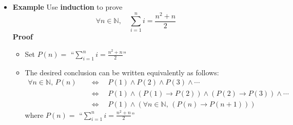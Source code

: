 \documentclass[11pt,twoside]{report}
\begin{document}
\begin{itemize}
\begin{itemize}
\item WLOG assume $p,q$ are coprime (no common divisors)
\begin{align*}
p = x q \quad \implies \quad p^2 = 2 q^2 \quad  \implies  \quad \text{$p^2$ is even} \quad  \implies  \quad \text{$p$ is even} 
\end{align*}
Hence, $\exists k \in \mathbb{N}$, $p = 2k$. Plugging this back in, we see that
\begin{align*}
 (2k)^2 = 2 q^2 \quad \implies \quad 2k^2 = q^2 \quad  \implies  \quad \text{$q^2$ is even} \quad  \implies  \quad \text{$q$ is even} 
\end{align*}
%
\item But $p$ is even and $q$ is even contradicts the assumption that $p$ and $q$ are coprime. Thus we conclude that no such $x$ exists. 
\end{itemize}


\item \textbf{Example} Use \textbf{induction} to prove
\[
\forall n \in \mathbb{N}, \quad \sum_{i=1}^n i  = \frac{n^2 + n}{2} 
\]
\textbf{Proof} 
\begin{itemize}
\item Set $P(n) = $ ``$ \sum_{i=1}^n i  = \frac{n^2 + n}{2}$''
\item The desired conclusion can  be written equivalently as follows: 
\begin{align*}
\forall n \in \mathbb{N}, \, P(n)  \quad & \iff \quad  P(1) \wedge P(2) \wedge P(3) \wedge \cdots\\
& \iff \quad  P(1) \wedge ( P(1) \to  P(2)  ) \wedge  ( P(2) \to P(3) )  \wedge \cdots\\
& \iff \quad  P(1) \wedge ( \forall n \in \mathbb{N}, \,  ( P(n) \to  P(n+1)  )  ) \
\end{align*}
where  $P(n) = $ ``$ \sum_{i=1}^n i  = \frac{n^2 + n}{2}$''


\end{itemize}
\end{itemize}
\end{document}
